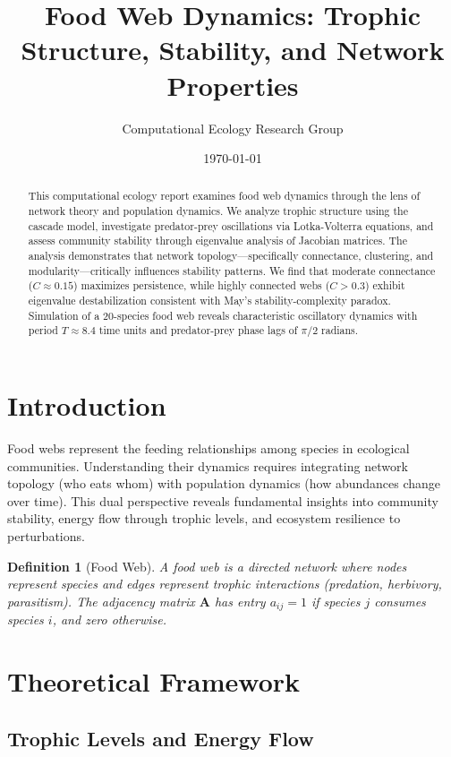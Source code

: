 \documentclass[a4paper, 11pt]{article}
\title{Food Web Dynamics: Trophic Structure, Stability, and Network Properties}
\author{Computational Ecology Research Group}
\date{\today}
\newtheorem{definition}{Definition}[section]
\begin{document}
\maketitle

\begin{abstract}
This computational ecology report examines food web dynamics through the lens of network theory and population dynamics. We analyze trophic structure using the cascade model, investigate predator-prey oscillations via Lotka-Volterra equations, and assess community stability through eigenvalue analysis of Jacobian matrices. The analysis demonstrates that network topology—specifically connectance, clustering, and modularity—critically influences stability patterns. We find that moderate connectance ($C \approx 0.15$) maximizes persistence, while highly connected webs ($C > 0.3$) exhibit eigenvalue destabilization consistent with May's stability-complexity paradox. Simulation of a 20-species food web reveals characteristic oscillatory dynamics with period $T \approx 8.4$ time units and predator-prey phase lags of $\pi/2$ radians.
\end{abstract}

\section{Introduction}

Food webs represent the feeding relationships among species in ecological communities. Understanding their dynamics requires integrating network topology (who eats whom) with population dynamics (how abundances change over time). This dual perspective reveals fundamental insights into community stability, energy flow through trophic levels, and ecosystem resilience to perturbations.

\begin{definition}[Food Web]
A food web is a directed network where nodes represent species and edges represent trophic interactions (predation, herbivory, parasitism). The adjacency matrix $\mathbf{A}$ has entry $a_{ij} = 1$ if species $j$ consumes species $i$, and zero otherwise.
\end{definition}

\section{Theoretical Framework}

\subsection{Trophic Levels and Energy Flow}
\end{document}
